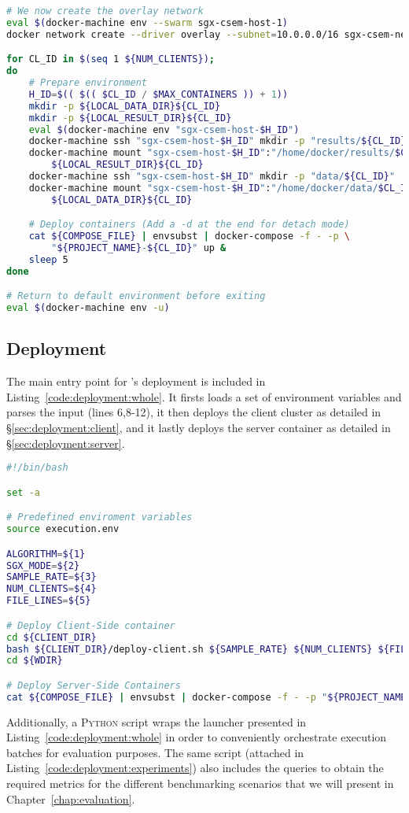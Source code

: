 \begin{lstlisting}[language=sh,caption={Client Cluster Deployment Script.},label=code:deploy-client]
# We now create the overlay network
eval $(docker-machine env --swarm sgx-csem-host-1)
docker network create --driver overlay --subnet=10.0.0.0/16 sgx-csem-net

for CL_ID in $(seq 1 ${NUM_CLIENTS});
do
    # Prepare environment
    H_ID=$(( $(( $CL_ID / $MAX_CONTAINERS )) + 1))
    mkdir -p ${LOCAL_DATA_DIR}${CL_ID}
    mkdir -p ${LOCAL_RESULT_DIR}${CL_ID}
    eval $(docker-machine env "sgx-csem-host-$H_ID")
    docker-machine ssh "sgx-csem-host-$H_ID" mkdir -p "results/${CL_ID}"
    docker-machine mount "sgx-csem-host-$H_ID":"/home/docker/results/$CL_ID" \
        ${LOCAL_RESULT_DIR}${CL_ID}
    docker-machine ssh "sgx-csem-host-$H_ID" mkdir -p "data/${CL_ID}"
    docker-machine mount "sgx-csem-host-$H_ID":"/home/docker/data/$CL_ID" \
        ${LOCAL_DATA_DIR}${CL_ID}

    # Deploy containers (Add a -d at the end for detach mode)
    cat ${COMPOSE_FILE} | envsubst | docker-compose -f - -p \
        "${PROJECT_NAME}-${CL_ID}" up &
    sleep 5
done

# Return to default environment before exiting
eval $(docker-machine env -u)
\end{lstlisting}

\subsection{\projName Deployment} \label{sec:deployment:all}

The main entry point for \projName's deployment is included in Listing~\ref{code:deployment:whole}.
It firsts loads a set of environment variables and parses the input (lines 6,8-12), it then deploys the client cluster as detailed in \S\ref{sec:deployment:client}, and it lastly deploys the server container as detailed in \S\ref{sec:deployment:server}.
\begin{lstlisting}[language=sh,caption={Main entry point for a single \projName execution.},label=code:deployment:whole]
#!/bin/bash

set -a

# Predefined enviroment variables
source execution.env

ALGORITHM=${1}
SGX_MODE=${2}
SAMPLE_RATE=${3}
NUM_CLIENTS=${4}
FILE_LINES=${5}

# Deploy Client-Side container
cd ${CLIENT_DIR}
bash ${CLIENT_DIR}/deploy-client.sh ${SAMPLE_RATE} ${NUM_CLIENTS} ${FILE_LINES}
cd ${WDIR}

# Deploy Server-Side Containers
cat ${COMPOSE_FILE} | envsubst | docker-compose -f - -p "${PROJECT_NAME}" up &
\end{lstlisting}

Additionally, a \textsc{Python} script wraps the launcher presented in Listing~\ref{code:deployment:whole} in order to conveniently orchestrate execution batches for evaluation purposes.
The same script (attached in Listing~\ref{code:deployment:experiments}) also includes the queries to obtain the required metrics for the different benchmarking scenarios that we will present in Chapter~\ref{chap:evaluation}.
